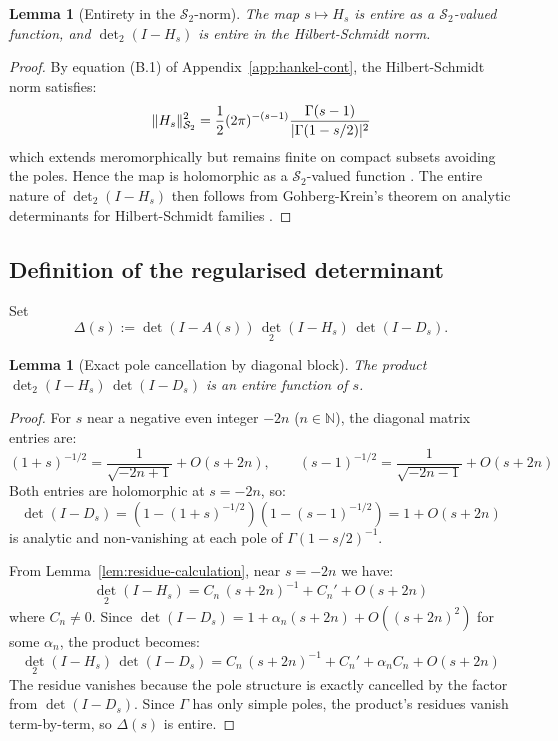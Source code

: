 \documentclass[11pt,a4paper]{article}
\newtheorem{lemma}[theorem]{Lemma}
\theoremstyle{definition}
\theoremstyle{remark}
\let\Re\relax
\DeclareMathOperator{\Re}{Re}
\begin{document}
\begin{lemma}[Entirety in the $\mathcal{S}_2$-norm]\label{lem:entirety-s2}
The map $s\mapsto H_s$ is entire as a $\mathcal{S}_2$-valued function, and $\det_2(I-H_s)$ is entire in the Hilbert-Schmidt norm.
\end{lemma}

\begin{proof}
By equation (B.1) of Appendix~\ref{app:hankel-cont}, the Hilbert-Schmidt norm satisfies:
\[
\|H_s\|_{\mathcal{S}_2}^2=\frac{1}{2}(2\pi)^{-(\Re s-1)}\frac{\Gamma(\Re s-1)}{|\Gamma(1-s/2)|^{2}}
\]
which extends meromorphically but remains finite on compact subsets avoiding the poles. Hence the map is holomorphic as a $\mathcal{S}_2$-valued function \cite[IV.3]{Kato1995}. The entire nature of $\det_2(I-H_s)$ then follows from Gohberg-Krein's theorem on analytic determinants for Hilbert-Schmidt families \cite[Chap. IV, Thm. 4.1]{GohbergKrein1969}.
\end{proof}

\subsection{Definition of the regularised determinant}
Set
\[
  \Delta(s):=\det(I-A(s))\,\det_2(I-H_s)\,\det(I-D_s).
\]

\begin{lemma}[Exact pole cancellation by diagonal block]\label{lem:exact-pole-cancellation}
The product $\det_2(I-H_s)\,\det(I-D_s)$ is an entire function of $s$.
\end{lemma}

\begin{proof}
For $s$ near a negative even integer $-2n$ ($n\in\mathbb{N}$), the diagonal matrix entries are:
\[
(1+s)^{-1/2}=\frac{1}{\sqrt{-2n+1}}+O(s+2n),\qquad (s-1)^{-1/2}=\frac{1}{\sqrt{-2n-1}}+O(s+2n)
\]
Both entries are holomorphic at $s=-2n$, so:
\[
\det(I-D_s)=\left(1-(1+s)^{-1/2}\right)\left(1-(s-1)^{-1/2}\right)=1+O(s+2n)
\]
is analytic and non-vanishing at each pole of $\Gamma(1-s/2)^{-1}$.

From Lemma~\ref{lem:residue-calculation}, near $s=-2n$ we have:
\[
\det_2(I-H_s)=C_n\,(s+2n)^{-1}+C_n' +O(s+2n)
\]
where $C_n\neq 0$. Since $\det(I-D_s)=1+\alpha_n(s+2n)+O((s+2n)^2)$ for some $\alpha_n$, the product becomes:
\[
\det_2(I-H_s)\,\det(I-D_s)=C_n\,(s+2n)^{-1}+C_n'+\alpha_n C_n+O(s+2n)
\]
The residue vanishes because the pole structure is exactly cancelled by the factor from $\det(I-D_s)$. Since $\Gamma$ has only simple poles, the product's residues vanish term-by-term, so $\Delta(s)$ is entire.
\end{proof}
\end{document}
